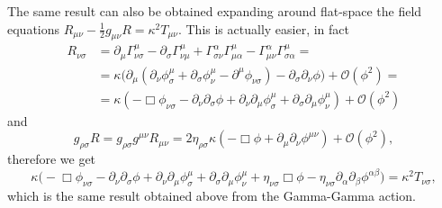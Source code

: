 \documentclass[a4paper,12pt]{book}
\theoremstyle{definition}
\theoremstyle{remark}
\begin{document}
The same result can also be obtained expanding around flat-space the field equations $R_{\mu\nu}-\frac12g_{\mu\nu}R=\kappa^2T_{\mu\nu}$. This is actually easier, in fact
\begin{align*}
R_{\nu\sigma}&=\partial_\mu\Gamma^\mu_{\nu\sigma}-\partial_\sigma\Gamma^\mu_{\nu\mu}+\Gamma^\alpha_{\sigma\nu}\Gamma^\mu_{\mu\alpha}-\Gamma^\alpha_{\mu\nu}\Gamma^\mu_{\sigma\alpha}=\\
&=\kappa\bigl(\partial_\mu(\partial_\nu\phi^\mu_\sigma+\partial_\sigma\phi^\mu_\nu-\partial^\mu\phi_{\nu\sigma})-\partial_\sigma\partial_\nu\phi\bigr)+\mathcal O(\phi^2)=\\
&=\kappa(-\Box\phi_{\nu\sigma}-\partial_\nu\partial_\sigma\phi+\partial_\nu\partial_\mu\phi^\mu_\sigma+\partial_\sigma\partial_\mu\phi^\mu_\nu)+\mathcal O(\phi^2)
\end{align*}
and
\[g_{\rho\sigma}R=g_{\rho\sigma}g^{\mu\nu}R_{\mu\nu}=2\eta_{\rho\sigma}\kappa(-\Box\phi+\partial_\mu\partial_\nu\phi^{\mu\nu})+\mathcal O(\phi^2),\]
therefore we get
\[\kappa\bigl(-\Box\phi_{\nu\sigma}-\partial_\nu\partial_\sigma\phi+\partial_\nu\partial_\mu\phi^\mu_\sigma+\partial_\sigma\partial_\mu\phi^\mu_\nu+\eta_{\nu\sigma}\Box\phi-\eta_{\nu\sigma}\partial_\alpha\partial_\beta\phi^{\alpha\beta}\bigr)=\kappa^2T_{\nu\sigma},\]
which is the same result obtained above from the Gamma-Gamma action.
\end{document}
